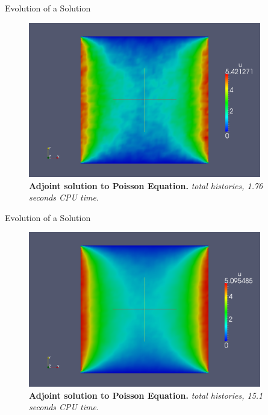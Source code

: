 \documentclass{beamer}
\begin{document}
\begin{frame}{Evolution of a Solution}

  \begin{figure}[h!]
    \begin{center}
      \includegraphics[width=4in]{adjoint_100000.png}
    \end{center}
    \caption{\textbf{Adjoint solution to Poisson Equation.}
      \textit{ total histories, 1.76 seconds CPU time.} }
  \end{figure}

\end{frame}

\begin{frame}{Evolution of a Solution}

  \begin{figure}[h!]
    \begin{center}
      \includegraphics[width=4in]{adjoint_1000000.png}
    \end{center}
    \caption{\textbf{Adjoint solution to Poisson Equation.}
      \textit{ total histories, 15.1 seconds CPU time.} }
  \end{figure}

\end{frame}
\end{document}
